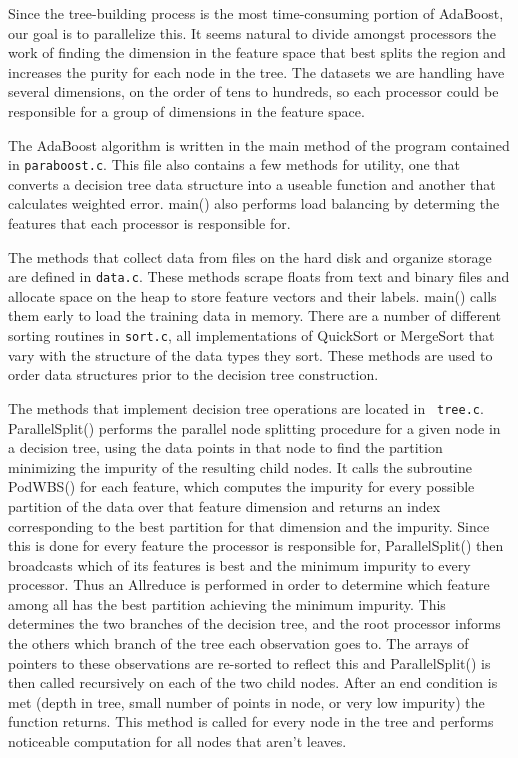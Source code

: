 \documentclass[12pt]{article}
\begin{document}
Since the tree-building process is the most time-consuming portion of AdaBoost,
our goal is to parallelize this. It seems natural to divide amongst processors
the work of finding the dimension in the feature space that best splits the
region and increases the purity for each node in the tree. The datasets we are
handling have several dimensions, on the order of tens to hundreds, so each
processor could be responsible for a group of dimensions in the feature space.

The AdaBoost algorithm is written in the main method of the program contained
in {\tt paraboost.c}. This file also contains a few methods for utility, one
that converts a decision tree data structure into a useable function and
another that calculates weighted error. main() also performs load balancing by
determing the features that each processor is responsible for. 

The methods that collect data from files on the hard disk and organize storage
are defined in {\tt data.c}. These methods scrape floats from text and binary
files and allocate space on the heap to store feature vectors and their labels.
main() calls them early to load the training data in memory. There are a number
of different sorting routines in {\tt sort.c}, all implementations of QuickSort
or MergeSort that vary with the structure of the data types they sort. These
methods are used to order data structures prior to the decision tree
construction.

The methods that implement decision tree operations are located in {\tt
tree.c}. ParallelSplit() performs the parallel node splitting procedure for a
given node in a decision tree, using the data points in that node to find the
partition minimizing the impurity of the resulting child nodes. It calls the
subroutine PodWBS() for each feature, which computes the impurity for every
possible partition of the data over that feature dimension and returns an index
corresponding to the best partition for that dimension and the impurity. Since
this is done for every feature the processor is responsible for,
ParallelSplit() then broadcasts which of its features is best and the minimum
impurity to every processor. Thus an Allreduce is performed in order to
determine which feature among all has the best partition achieving the minimum
impurity. This determines the two branches of the decision tree, and the root
processor informs the others which branch of the tree each observation goes to.
The arrays of pointers to these observations are re-sorted to reflect this and
ParallelSplit() is then called recursively on each of the two child nodes.
After an end condition is met (depth in tree, small number of points
in node, or very low impurity) the function returns. This method is called for every node in the tree and performs noticeable computation for all nodes that aren't leaves.
\end{document}
